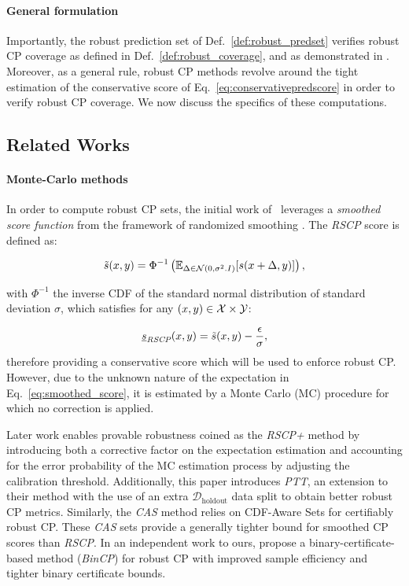 \paragraph{General formulation} Importantly, the robust prediction set of Def.~\ref{def:robust_predset} verifies robust CP coverage as defined in Def.~\ref{def:robust_coverage}, and as demonstrated in \citet{vrcp}.
Moreover, as a general rule, robust CP methods revolve around the tight estimation of the conservative score of Eq.~\eqref{eq:conservativepredscore} in order to verify robust CP coverage. We now discuss the specifics of these computations.

\subsection{Related Works} 
\label{sec:relatedWorks}

\paragraph{Monte-Carlo methods} In order to compute robust CP sets, the initial work of~\citet{rscp} leverages a \textit{smoothed score function} from the framework of randomized smoothing \cite{cohen2019certifiedadversarialrobustnessrandomized}. The \emph{RSCP} score is defined as:

\begin{equation}
    \Tilde{s}(x,y) = \Phi^{-1} \left( \mathbb{E}_{\Delta \in \mathcal{N}(0,\sigma^2.I)}[s(x+\Delta,y)] \right),
\label{eq:smoothed_score}
\end{equation}

with $\Phi^{-1}$ the inverse CDF of the standard normal distribution of standard deviation $\sigma$, which satisfies for any $(x,y) \in \mathcal{X} \times \mathcal{Y}$:

\begin{equation}
    \underline{s}_{\emph{RSCP}} (x,y) = \Tilde{s}(x,y) - \frac{\epsilon}{\sigma},
\end{equation}
%
therefore providing a conservative score which will be used to enforce robust CP. However, due to the unknown nature of the expectation in Eq.~\eqref{eq:smoothed_score}, it is estimated by a Monte Carlo (MC) procedure for which no correction is applied. 

Later work \cite{rscp_plus} enables provable robustness coined as the \emph{RSCP+} method by introducing both a corrective factor on the expectation estimation and accounting for the error probability of the MC estimation process by adjusting the calibration threshold. Additionally, this paper introduces \emph{PTT}, an extension to their method with the use of an extra $\mathcal{D}_\mathrm{holdout}$ data split to obtain better robust CP metrics.
Similarly, the \emph{CAS} method relies on CDF-Aware Sets \cite{cas} for certifiably robust CP. These \emph{CAS} sets provide a generally tighter bound for smoothed CP scores than \emph{RSCP}. In an independent work to ours, \citet{bincp} propose a binary-certificate-based method (\emph{BinCP}) for robust CP with improved sample efficiency and tighter binary certificate bounds.


